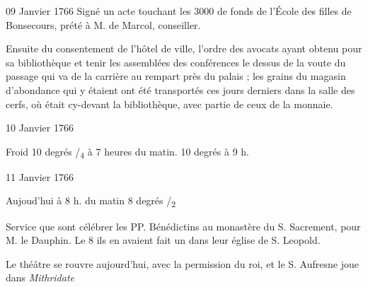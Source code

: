 \begin{diary}{09 Janvier 1766}{}
                         Signé un acte touchant les 3000\up{\#}
                           de fonds de l'École
                              des filles de Bonsecours, prété à M. de Marcol, conseiller. \bigskip




                         Ensuite du consentement de l'hôtel de ville,
                           l'ordre des avocats
                           ayant obtenu pour
                           sa bibliothèque et tenir les assemblées des
                           conférences le dessus de la voute du passage
                           qui va de la carrière
                           au rempart près du
                           palais ; les grains du
                           magasin d'abondance
                           qui y étaient ont été transportés ces jours
                           derniers dans la salle des cerfs, où était
                           cy-devant
                           la bibliothèque, avec partie de ceux de
                           la monnaie. \bigskip


                     \end{diary}

                     \begin{diary}{10 Janvier 1766}{}


                           Froid 10 degrés
                              /\textsubscript{4} à 7 heures du
                              matin.
                           10 degrés à 9 h. \bigskip


                     \end{diary}

                     \begin{diary}{11 Janvier 1766}{}


                           Aujoud'hui à 8 h.
                              du matin
                           8 degrés
                              /\textsubscript{2}
                        \bigskip


                         Service que sont célébrer les PP. Bénédictins
                           au monastère du S.
                              Sacrement, pour
                           M. le Dauphin. Le 8 ils en avaient
                           fait un dans leur église de S.
                              Leopold. \bigskip



                           Le théâtre se rouvre
                           aujourd'hui, avec la
                           permission du roi, et
                              le S. Aufresne joue
                           dans \emph{Mithridate}
                        \bigskip


                     \end{diary}

